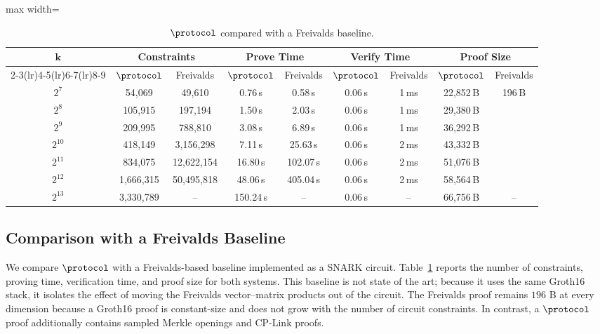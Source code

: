 \begin{table}[!t]
\centering
\setlength{\tabcolsep}{3.5pt}
\begin{adjustbox}{max width=\textwidth}
\begin{tabular}{c cc cc cc cc}
\toprule
\multirow{2}{*}{\(\boldsymbol{k}\)}
& \multicolumn{2}{c}{\textbf{Constraints}}
& \multicolumn{2}{c}{\textbf{Prove Time}}
& \multicolumn{2}{c}{\textbf{Verify Time}}
& \multicolumn{2}{c}{\textbf{Proof Size}} \\
\cmidrule(lr){2-3}\cmidrule(lr){4-5}\cmidrule(lr){6-7}\cmidrule(lr){8-9}
& \(\protocol\) & Freivalds
& \(\protocol\) & Freivalds
& \(\protocol\) & Freivalds
& \(\protocol\) & Freivalds \\
\midrule
$2^7$    & 54{,}069      & 49{,}610       & 0.76\,s   & 0.58\,s   & 0.06\,s & 1\,ms & 22{,}852\,B & \multirow{6}{*}{196\,B} \\
$2^8$    & 105{,}915     & 197{,}194      & 1.50\,s   & 2.03\,s   & 0.06\,s & 1\,ms & 29{,}380\,B & \\
$2^9$    & 209{,}995     & 788{,}810      & 3.08\,s   & 6.89\,s   & 0.06\,s & 1\,ms & 36{,}292\,B & \\
$2^{10}$ & 418{,}149     & 3{,}156{,}298  & 7.11\,s   & 25.63\,s  & 0.06\,s & 2\,ms & 43{,}332\,B & \\
$2^{11}$ & 834{,}075     & 12{,}622{,}154 & 16.80\,s  & 102.07\,s & 0.06\,s & 2\,ms & 51{,}076\,B & \\
$2^{12}$ & 1{,}666{,}315 & 50{,}495{,}818 & 48.06\,s  & 405.04\,s & 0.06\,s & 2\,ms & 58{,}564\,B & \\
$2^{13}$ & 3{,}330{,}789 & --             & 150.24\,s & --        & 0.06\,s & --    & 66{,}756\,B & -- \\
\bottomrule
\end{tabular}
\end{adjustbox}
\vspace{6pt}
\caption{\(\protocol\) compared with a Freivalds baseline.}
\label{tab:lamp-vs-freivalds}
\end{table}


\subsection{Comparison with a Freivalds Baseline}
\label{sec:eval-freivalds}
We compare \(\protocol\) with a Freivalds-based baseline implemented as a
SNARK circuit. Table~\ref{tab:lamp-vs-freivalds} reports the number of
constraints, proving time, verification time, and proof size for both systems.
This baseline is not state of the art; because it uses the same Groth16 stack,
it isolates the effect of moving the Freivalds vector--matrix products out of
the circuit. The Freivalds proof remains \(196\) B at every dimension because a
Groth16 proof is constant-size and does not grow with the number of circuit
constraints. In contrast, a \(\protocol\) proof additionally contains sampled
Merkle openings and CP-Link proofs.

